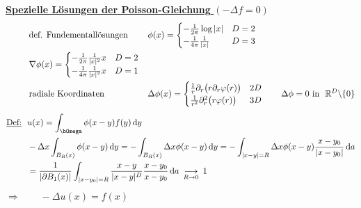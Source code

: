 \documentclass[12pt,twoside,reqno]{article}
\newcommand{\dy}{\,\mathrm{d}y}
\newcommand{\da}{\,\mathrm{d}a}
\renewcommand{\Omega}{\bOmega}
\newcommand{\R}{\mathbb{R}}
\theoremstyle{TheoWieners}
\theoremstyle{break}
\theoremstyle{app}
\newtheorem{Spezielle Lösungen}[app]{Spezielle Lösungen}
\newtheorem{Spezielle Lösungen der Poisson-Gleichung}[app]{Spezielle Lösungen der Poisson-Gleichung}
\newtheorem{Kartesische Gitter in 2-d}[app]{Kartesische Gitter in 2-d}
\newtheorem{Diskretisierungen hoher Ordnung}[app]{Diskretisierungen hoher Ordnung}
\newtheorem{Zyklische Reduktion}[app]{Zyklische Reduktion}
\begin{document}
\underline{\textbf{Spezielle Lösungen der Poisson-Gleichung} $(-\Delta f=0 )$}
\begin{align*}
       \qquad \ \ \hspace{0.0cm} &\text{def. Fundementallösungen  }   &&  \phi(x) = \begin{cases}-\frac{1}{2\pi} \log|x|  &D=2\\-\frac{1}{4\pi} \frac{1}{|x|} &D=3 \end{cases} \\
        &\nabla \phi(x) = \begin{cases}-\frac{1}{2\pi} \frac{1}{|x|^2}x &D=2 \\ -\frac{1}{4\pi} \frac{1}{|x|^3}x & D=1\end{cases}  && \text{} \\
        &\text{radiale Koordinaten}	    &&\Delta \phi(x) = \begin{cases}\frac{1}{r}\partial_r \big(r \partial_r \varphi(r)\big) &2D \qquad \\\frac{1}{r^2}\partial_r^2 \big(r \varphi(r)\big) &3D \qquad  \end{cases}\Delta \phi =0 \text{ in } \ \R^D \backslash \{ 0\}
            \end{align*}
    \begin{align*}
    \underline{\text{Def:}} \ \ &u(x) = \int_{\Omega} \phi (x-y) f(y) \dy \\
    &-\Delta x \int_{B_R (x)}\phi(x-y) \dy = -  \int_{B_R (x)} \Delta x\phi(x-y) \dy = -  \int_{|x-y|=R} \Delta x\phi(x-y) \frac{x-y_0}{|x-y_0|} \da\\
    &=\frac{1}{|\partial B_1 (x)|}\int_{|x-y_0|=R} \frac{x-y}{|x-y|^D} \frac{x-y_0}{x-y_0} \da  \ \mathop{\mathrm{\longrightarrow}}\limits_{R \rightarrow 0} \ 1
    \end{align*}
  $  \Longrightarrow \qquad - \Delta u(x)= f(x)$
\end{document}

